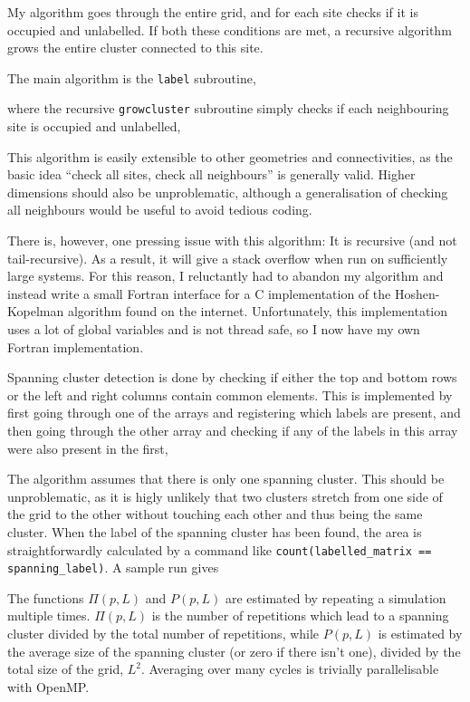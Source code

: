 \documentclass[11pt,british,a4paper]{report}
\begin{document}
My algorithm goes through the entire grid, and for each site checks if it is occupied and unlabelled. If both these conditions are met, a recursive algorithm grows the entire cluster connected to this site.

The main algorithm is the \lstinline{label} subroutine,

where the recursive \lstinline{growcluster} subroutine simply checks if each neighbouring site is occupied and unlabelled,

This algorithm is easily extensible to other geometries and connectivities, as the basic idea ``check all sites, check all neighbours'' is generally valid. Higher dimensions should also be unproblematic, although a generalisation of checking all neighbours would be useful to avoid tedious coding.

There is, however, one pressing issue with this algorithm: It is recursive (and not tail-recursive). As a result, it will give a stack overflow when run on sufficiently large systems. For this reason, I reluctantly had to abandon my algorithm and instead write a small Fortran interface for a C implementation of the Hoshen-Kopelman algorithm found on the internet\cite{fricke_hoshen-kopelman_2004}. Unfortunately, this implementation uses a lot of global variables and is not thread safe, so I now have my own Fortran implementation.

Spanning cluster detection is done by checking if either the top and bottom rows or the left and right columns contain common elements. This is implemented by first going through one of the arrays and registering which labels are present, and then going through the other array and checking if any of the labels in this array were also present in the first,

The algorithm assumes that there is only one spanning cluster. This should be unproblematic, as it is higly unlikely that two clusters stretch from one side of the grid to the other without touching each other and thus being the same cluster. When the label of the spanning cluster has been found, the area is straightforwardly calculated by a command like \lstinline{count(labelled_matrix == spanning_label)}.
A sample run gives


The functions \(\Pi(p,L)\) and \(P(p,L)\) are estimated by repeating a simulation multiple times. \(\Pi(p,L)\) is the number of repetitions which lead to a spanning cluster divided by the total number of repetitions, while \(P(p,L)\) is estimated by the average size of the spanning cluster (or zero if there isn't one), divided by the total size of the grid, \(L^2\). Averaging over many cycles is trivially parallelisable with OpenMP.
\end{document}
